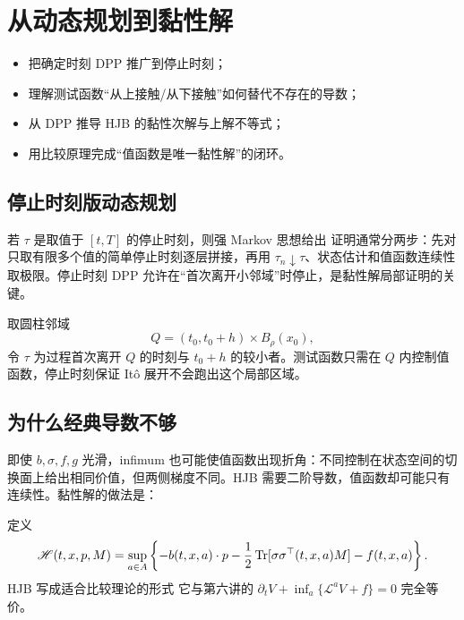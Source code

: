 \chapter{从动态规划到黏性解}
\begin{learninggoals}
\begin{itemize}
  \item 把确定时刻 DPP 推广到停止时刻；
  \item 理解测试函数“从上接触/从下接触”如何替代不存在的导数；
  \item 从 DPP 推导 HJB 的黏性次解与上解不等式；
  \item 用比较原理完成“值函数是唯一黏性解”的闭环。
\end{itemize}
\end{learninggoals}

\section{停止时刻版动态规划}

若 $\tau$ 是取值于 $[t,T]$ 的停止时刻，则强 Markov 思想给出
证明通常分两步：先对只取有限多个值的简单停止时刻逐层拼接，再用 $\tau_n\downarrow\tau$、状态估计和值函数连续性取极限。停止时刻 DPP 允许在“首次离开小邻域”时停止，是黏性解局部证明的关键。

\begin{examplebox}[退出时刻]
取圆柱邻域
\[
Q=(t_0,t_0+h)\times B_\rho(x_0),
\]
令 $\tau$ 为过程首次离开 $Q$ 的时刻与 $t_0+h$ 的较小者。测试函数只需在 $Q$ 内控制值函数，停止时刻保证 Itô 展开不会跑出这个局部区域。
\end{examplebox}

\section{为什么经典导数不够}

即使 $b,\sigma,f,g$ 光滑，infimum 也可能使值函数出现折角：不同控制在状态空间的切换面上给出相同价值，但两侧梯度不同。HJB 需要二阶导数，值函数却可能只有连续性。黏性解的做法是：

\begin{quote}
\centering
{}
\end{quote}

定义
\[
\mathscr H(t,x,p,M)
=\sup_{a\in A}\left\{
-b(t,x,a)\cdot p
-\frac12\operatorname{Tr}[\sigma\sigma^\top(t,x,a)M]
-f(t,x,a)\right\}.
\]
HJB 写成适合比较理论的形式
它与第六讲的 $\partial_tV+\inf_a\{\mathcal L^aV+f\}=0$ 完全等价。

